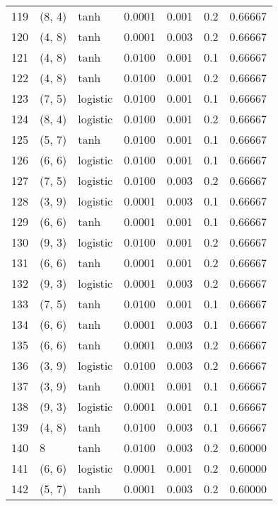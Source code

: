 \begin{tabular}{lllrrrr}
119 &      (8, 4) &      tanh &  0.0001 &  0.001 &  0.2 &   0.66667 \\
120 &      (4, 8) &      tanh &  0.0001 &  0.003 &  0.2 &   0.66667 \\
121 &      (4, 8) &      tanh &  0.0100 &  0.001 &  0.1 &   0.66667 \\
122 &      (4, 8) &      tanh &  0.0100 &  0.001 &  0.2 &   0.66667 \\
123 &      (7, 5) &  logistic &  0.0100 &  0.001 &  0.1 &   0.66667 \\
124 &      (8, 4) &  logistic &  0.0100 &  0.001 &  0.2 &   0.66667 \\
125 &      (5, 7) &      tanh &  0.0100 &  0.001 &  0.1 &   0.66667 \\
126 &      (6, 6) &  logistic &  0.0100 &  0.001 &  0.1 &   0.66667 \\
127 &      (7, 5) &  logistic &  0.0100 &  0.003 &  0.2 &   0.66667 \\
128 &      (3, 9) &  logistic &  0.0001 &  0.003 &  0.1 &   0.66667 \\
129 &      (6, 6) &      tanh &  0.0001 &  0.001 &  0.1 &   0.66667 \\
130 &      (9, 3) &  logistic &  0.0100 &  0.001 &  0.2 &   0.66667 \\
131 &      (6, 6) &      tanh &  0.0001 &  0.001 &  0.2 &   0.66667 \\
132 &      (9, 3) &  logistic &  0.0001 &  0.003 &  0.2 &   0.66667 \\
133 &      (7, 5) &      tanh &  0.0100 &  0.001 &  0.1 &   0.66667 \\
134 &      (6, 6) &      tanh &  0.0001 &  0.003 &  0.1 &   0.66667 \\
135 &      (6, 6) &      tanh &  0.0001 &  0.003 &  0.2 &   0.66667 \\
136 &      (3, 9) &  logistic &  0.0100 &  0.003 &  0.2 &   0.66667 \\
137 &      (3, 9) &      tanh &  0.0001 &  0.001 &  0.1 &   0.66667 \\
138 &      (9, 3) &  logistic &  0.0001 &  0.001 &  0.1 &   0.66667 \\
139 &      (4, 8) &      tanh &  0.0100 &  0.003 &  0.1 &   0.66667 \\
140 &           8 &      tanh &  0.0100 &  0.003 &  0.2 &   0.60000 \\
141 &      (6, 6) &  logistic &  0.0001 &  0.001 &  0.2 &   0.60000 \\
142 &      (5, 7) &      tanh &  0.0001 &  0.003 &  0.2 &   0.60000 \\

\end{tabular}

